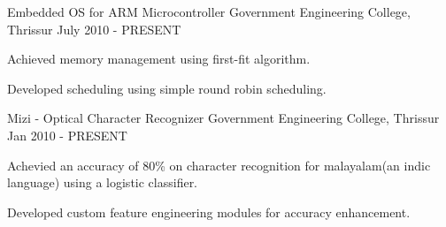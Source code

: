 
\begin{cventries}
  \cventry
    {}
    {Embedded OS for ARM Microcontroller}
    {Government Engineering College, Thrissur} 
    {July 2010 - PRESENT} 
    {
      \begin{cvitems}
        \item {Achieved memory management using first-fit algorithm.}
        \item {Developed scheduling using simple round robin scheduling.}
      \end{cvitems}
    }
  \cventry
    {}
    {Mizi - Optical Character Recognizer}
    {Government Engineering College, Thrissur} 
    {Jan 2010 - PRESENT} 
    {
      \begin{cvitems}
        \item {Achevied an accuracy of 80\% on character recognition for malayalam(an indic language) using a logistic classifier.}
        \item {Developed custom feature engineering modules for accuracy enhancement.}
      \end{cvitems}
    }

    
\end{cventries}
